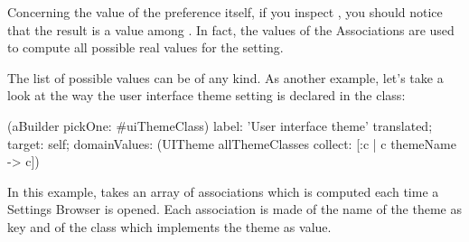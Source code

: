 \documentclass[a4paper,10pt,twoside]{book}
\begin{document}
Concerning the value of the preference itself, if you inspect , you should notice that the result is a value among . In fact, the values of the Associations are used to compute all possible real values for the setting.

The list of possible values can be of any kind. As another example, let's take a look at the way the user interface theme setting is declared in the  class:
\begin{code}{}
(aBuilder pickOne: #uiThemeClass)
	label: 'User interface theme' translated;
	target: self;
	domainValues: (UITheme allThemeClasses collect: [:c | c themeName -> c])
\end{code}
In this example,  takes an array of associations which is computed each time a Settings Browser is opened. Each association is made of the name of the theme as key and of the class which implements the theme as value.
\end{document}
